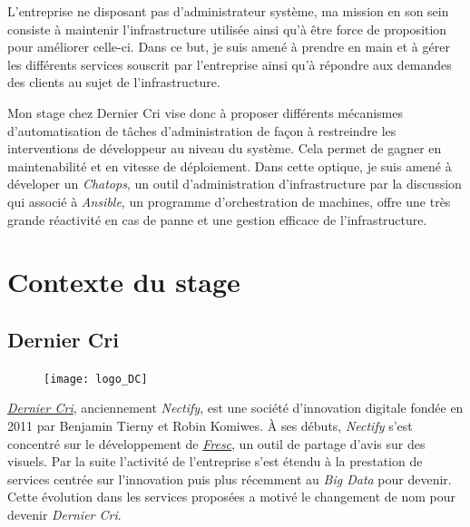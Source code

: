 \documentclass[11pt,a4paper]{article}
\begin{document}
  \bigskip

  L'entreprise ne disposant pas d'administrateur système, ma mission en
  son sein consiste à maintenir l'infrastructure utilisée ainsi qu'à être
  force de proposition pour améliorer celle-ci. Dans ce but, je suis amené
  à prendre en main et à gérer les différents services souscrit par
  l'entreprise ainsi qu'à répondre aux demandes des clients au sujet de
  l'infrastructure.

  \bigskip

  Mon stage chez Dernier Cri vise donc à proposer différents mécanismes
  d'automatisation de tâches d'administration de façon à restreindre les
  interventions de développeur au niveau du système. Cela permet de gagner
  en maintenabilité et en vitesse de déploiement. Dans cette optique, je
  suis amené à déveloper un \emph{Chatops}, un outil d'administration
  d'infrastructure par la discussion qui associé à \emph{Ansible}, un
  programme d'orchestration de machines, offre une très grande réactivité
  en cas de panne et une gestion efficace de l'infrastructure.

  \newpage

  \section{Contexte du stage}\label{contexte-du-stage}

  \subsection{Dernier Cri}\label{dernier-cri}

  \begin{figure}[htbp]
  \centering
  \texttt{[image: logo\_DC]}
  \caption{}
  \end{figure}

  \emph{\href{http://derniercri.io}{Dernier Cri}}, anciennement
  \emph{Nectify}, est une société d'innovation digitale fondée en 2011 par
  Benjamin Tierny et Robin Komiwes. À ses débuts, \emph{Nectify} s'est
  concentré sur le développement de \emph{\href{http://fre.sc}{Fresc}}, un
  outil de partage d'avis sur des visuels. Par la suite l'activité de
  l'entreprise s'est étendu à la prestation de services centrée sur
  l'innovation puis plus récemment au \emph{Big Data} pour devenir. Cette
  évolution dans les services proposées a motivé le changement de nom pour
  devenir \emph{Dernier Cri}.

  \bigskip
\end{document}
